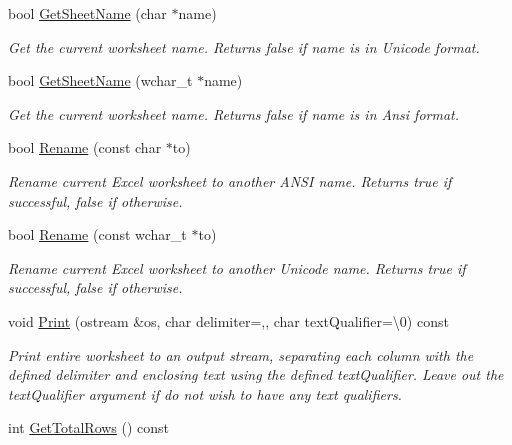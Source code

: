 \begin{DoxyCompactItemize}
bool \hyperlink{class_y_excel_1_1_basic_excel_worksheet_a8f15128ba07fe3864ed0e0478a823baa}{Get\+Sheet\+Name} (char $\ast$name)
\begin{DoxyCompactList}\small\item\em Get the current worksheet name. Returns false if name is in Unicode format. \end{DoxyCompactList}\item 
bool \hyperlink{class_y_excel_1_1_basic_excel_worksheet_adb4f97665b32ce8501dbfebcded117a4}{Get\+Sheet\+Name} (wchar\+\_\+t $\ast$name)
\begin{DoxyCompactList}\small\item\em Get the current worksheet name. Returns false if name is in Ansi format. \end{DoxyCompactList}\item 
bool \hyperlink{class_y_excel_1_1_basic_excel_worksheet_a3258a153e308a91b9b48574bdf6aaa39}{Rename} (const char $\ast$to)
\begin{DoxyCompactList}\small\item\em Rename current Excel worksheet to another A\+N\+S\+I name. Returns true if successful, false if otherwise. \end{DoxyCompactList}\item 
bool \hyperlink{class_y_excel_1_1_basic_excel_worksheet_aae84dfe5dc5bc2c52267e4c4ed46714a}{Rename} (const wchar\+\_\+t $\ast$to)
\begin{DoxyCompactList}\small\item\em Rename current Excel worksheet to another Unicode name. Returns true if successful, false if otherwise. \end{DoxyCompactList}\item 
void \hyperlink{class_y_excel_1_1_basic_excel_worksheet_ac6b8ceafcbcf0b8a85962fe13bbb88ee}{Print} (ostream \&os, char delimiter=\textquotesingle{},\textquotesingle{}, char text\+Qualifier=\textquotesingle{}\textbackslash{}0\textquotesingle{}) const 
\begin{DoxyCompactList}\small\item\em Print entire worksheet to an output stream, separating each column with the defined delimiter and enclosing text using the defined text\+Qualifier. Leave out the text\+Qualifier argument if do not wish to have any text qualifiers. \end{DoxyCompactList}\item 
int \hyperlink{class_y_excel_1_1_basic_excel_worksheet_a8dce97605c50fecefe3bed6a85898721}{Get\+Total\+Rows} () const 

\end{DoxyCompactItemize}
